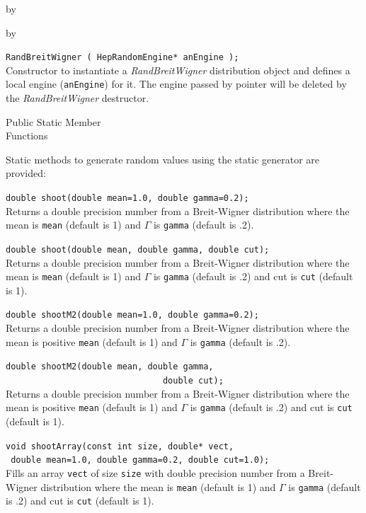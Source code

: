 \documentclass[twoside]{article}
\newcommand{\comp}[1]{\texttt{#1}}%
\newcommand{\entrylabel}[1]{\mbox{\textbf{{#1}}}\hfil}%
\newenvironment{entry}
{\begin{list}{}%
    {\renewcommand{\makelabel}{\entrylabel}%
     \setlength{\labelwidth}{90pt}%
     \setlength{\leftmargin}{\labelwidth}
     \advance\leftmargin by \labelsep%
      }%
    }%
  {\end{list}}
\newcommand{\Entrylabel}[1]%
{\raisebox{0pt}[1ex][0pt]{\makebox[\labelwidth][l]%
    {\parbox[t]{\labelwidth}{\hspace{0pt}\textbf{{#1}}}}}}
\newenvironment{Entry}%
{\renewcommand{\entrylabel}{\Entrylabel}\begin{entry}}%
  {\end{entry}}
\begin{document}
\begin{description}
\begin{Entry}
\begin{Entry}
    \verb+RandBreitWigner ( HepRandomEngine* anEngine );+\\
    Constructor to instantiate a {\em RandBreitWigner}
    distribution object and defines a local engine (\comp{anEngine})
    for it.  The engine passed by pointer will be deleted
    by the {\em RandBreitWigner} destructor.

\item[Public Static Member\\ Functions]
  
    Static methods to generate random values using the static generator
    are provided:

    \verb+double shoot(double mean=1.0, double gamma=0.2);+\\
    Returns a double precision number from a Breit-Wigner
    distribution where the mean is \comp{mean} (default is 1)
    and $\Gamma$ is \comp{gamma} (default is .2).
    
    \verb+double shoot(double mean, double gamma, double cut);+\\
    Returns a double precision number from a Breit-Wigner
    distribution where the mean is \comp{mean} (default is 1)
    and $\Gamma$ is \comp{gamma} (default is .2) and cut is
    \comp{cut} (default is 1).
    
    \verb+double shootM2(double mean=1.0, double gamma=0.2);+\\
    Returns a double precision number from a Breit-Wigner
    distribution where the mean is positive \comp{mean} (default is 1)
    and $\Gamma$ is \comp{gamma} (default is .2).
    
    \verb+double shootM2(double mean, double gamma,+\\
    \verb+                               double cut);+\\
    Returns a double precision number from a Breit-Wigner
    distribution where the mean is positive \comp{mean} (default is 1)
    and $\Gamma$ is \comp{gamma} (default is .2) and cut is
    \comp{cut} (default is 1).
    
    \verb+void shootArray(const int size, double* vect,+\\
    \verb+ double mean=1.0, double gamma=0.2, double cut=1.0);+\\
    Fills an array \comp{vect} of size \comp{size} with double
    precision number from a Breit-Wigner
    distribution where the mean is \comp{mean} (default is 1)
    and $\Gamma$ is \comp{gamma} (default is .2) and cut is
    \comp{cut} (default is 1).


\end{Entry}
\end{Entry}
\end{description}
\end{document}
